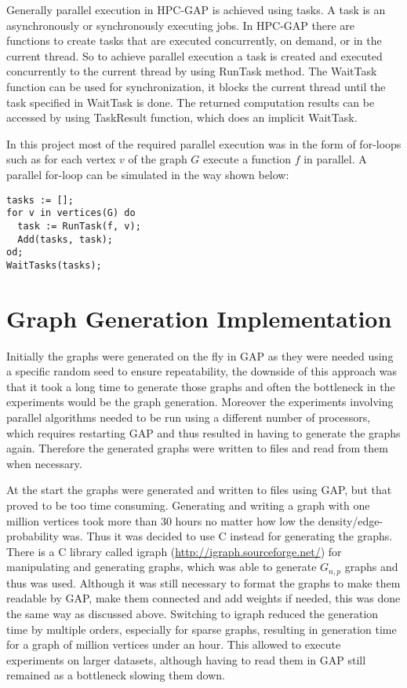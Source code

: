 \documentclass{report}
\theoremstyle{plain}
\theoremstyle{definition}
\theoremstyle{remark}
\begin{document}
Generally parallel execution in HPC-GAP is achieved using tasks. A task is an asynchronously or synchronously executing jobs. In HPC-GAP there are functions to create tasks that are executed concurrently, on demand, or in the current thread. So to achieve parallel execution a task is created and executed concurrently to the current thread by using RunTask method. The WaitTask function can be used for synchronization, it blocks the current thread until the task specified in WaitTask is done. The returned computation results can be accessed by using TaskResult function, which does an implicit WaitTask.

In this project most of the required parallel execution was in the form of for-loops such as for each vertex $v$ of the graph $G$ execute a function $f$ in parallel. A parallel for-loop can be simulated in the way shown below:

\begin{lstlisting}
tasks := [];
for v in vertices(G) do
  task := RunTask(f, v);
  Add(tasks, task);
od;
WaitTasks(tasks);
\end{lstlisting}

\section{Graph Generation Implementation}

Initially the graphs were generated on the fly in GAP as they were needed  using a specific random seed to ensure repeatability, the downside of this approach was that it took a long time to generate those graphs and often the bottleneck in the experiments would be the graph generation. Moreover the experiments involving parallel algorithms needed to be run using a different number of processors, which requires restarting GAP and thus resulted in having to generate the graphs again. Therefore the generated graphs were written to files and read from them when necessary.

At the start the graphs were generated and written to files using GAP, but that proved to be too time consuming. Generating and writing a graph with one million vertices took more than 30 hours no matter how low the density/edge-probability was. Thus it was decided to use C instead for generating the graphs. There is a C library called igraph (\url{http://igraph.sourceforge.net/}) for manipulating and generating graphs, which was able to generate $G_{n,p}$ graphs and thus was used. Although it was still necessary to format the graphs to make them readable by GAP, make them connected and add weights if needed, this was done the same way as discussed above. Switching to igraph reduced the generation time by multiple orders, especially for sparse graphs, resulting in generation time for a graph of million vertices under an hour. This allowed to execute experiments on larger datasets, although having to read them in GAP still remained as a bottleneck slowing them down.
\end{document}
